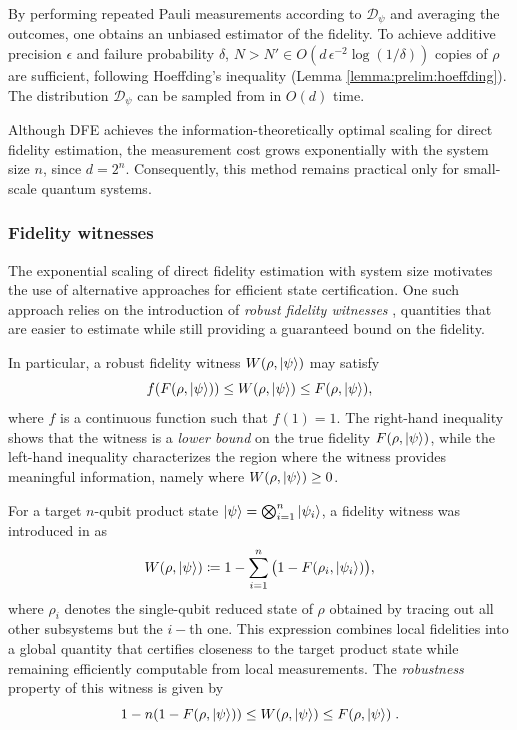 \documentclass[a4paper,twocolumn,11pt,unpublished]{quantumarticle}
\begin{document}
By performing repeated Pauli measurements according to $\mathcal{D}_\psi$ and averaging the outcomes, one obtains an unbiased estimator of the fidelity. To achieve additive precision $\epsilon$ and failure probability $\delta$, $N> N' \in O(d\, \epsilon^{-2} \log(1/\delta))$ copies of $\rho$ are sufficient, following Hoeffding's inequality (Lemma \ref{lemma:prelim:hoeffding}). 
The distribution $\mathcal{D}_\psi$ can be sampled from in $O(d)$ time.

Although DFE achieves the information-theoretically optimal scaling for direct fidelity estimation, the measurement cost grows exponentially with the system size $n$, since $d = 2^n$. Consequently, this method remains practical only for small-scale quantum systems.

\subsubsection{Fidelity witnesses}
\label{subsection:prelims:witness}
The exponential scaling of direct fidelity estimation with system size motivates the use of alternative approaches for efficient state certification. One such approach relies on the introduction of \emph{robust fidelity witnesses} \cite{CGKM21efficient,UC24efficient,HPS24certifying,GHO25few}, quantities that are easier to estimate while still providing a guaranteed bound on the fidelity.

In particular, a robust fidelity witness $W(\rho, \ket{\psi})$ may satisfy
\begin{equation}
\label{eq: robust fidelity witness}
    f(F(\rho, \ket{\psi}))
    \leq W(\rho, \ket{\psi}) 
    \leq F(\rho, \ket{\psi}) ,
\end{equation}
where $f$ is a continuous function such that $f(1) = 1$. 
The right-hand inequality shows that the witness is a \emph{lower bound} on the true fidelity $F(\rho, \ket{\psi})$, while the left-hand inequality characterizes the region where the witness provides meaningful information, namely where $W(\rho, \ket{\psi}) \ge 0$.

For a target $n$-qubit product state $\ket{\psi}=\bigotimes_{i=1}^n\ket{\psi_i}$, a fidelity witness was introduced in \cite{CGKM21efficient} as
\begin{equation}
    \label{eq:prelims:witness}
    W(\rho, \ket{\psi}) 
    \coloneqq 1 - 
    \sum_{i=1}^{n}
    \big(1 - F(\rho_i, \ket{\psi_i})\big),
\end{equation}
where $\rho_i$ denotes the single-qubit reduced state of $\rho$ obtained by tracing out all other subsystems but the $i-$th one.
This expression combines local fidelities into a global quantity that certifies closeness to the target product state while remaining efficiently computable from local measurements. The \emph{robustness} property of this witness is given by \cite{CGKM21efficient}
\begin{equation}
    \label{eq:prelims:witness:robustness}
    1-n(1-F(\rho, \ket\psi)) \leq W(\rho, \ket\psi)\leq F(\rho, \ket\psi)\; .
\end{equation}
\end{document}
